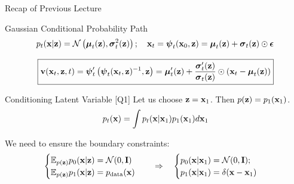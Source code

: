 \documentclass{beamer}
\begin{document}
\begin{frame}{Recap of Previous Lecture}
	\begin{block}{Gaussian Conditional Probability Path}
		\vspace{-0.5cm}
		\[
			p_t(\mathbf{x} | \mathbf{z}) = \mathcal{N}\left(\boldsymbol{\mu}_t(\mathbf{z}), \boldsymbol{\sigma}_t^2(\mathbf{z})\right); \quad \mathbf{x}_t = \boldsymbol{\psi}_t(\mathbf{x}_0, \mathbf{z}) = \boldsymbol{\mu}_t(\mathbf{z}) + \boldsymbol{\sigma}_t(\mathbf{z}) \odot \boldsymbol{\epsilon}
		\]
		\vspace{-0.5cm}
	\end{block}
	\vspace{-0.3cm}
	\[
		\boxed{\mathbf{v}(\mathbf{x}_t, \mathbf{z}, t) = \boldsymbol{\psi}_t'\left(\boldsymbol{\psi}_t(\mathbf{x}_t, \mathbf{z})^{-1}, \mathbf{z}\right) = \boldsymbol{\mu}_t'(\mathbf{z}) + \frac{\boldsymbol{\sigma}_t'(\mathbf{z})}{\boldsymbol{\sigma}_t(\mathbf{z})} \odot (\mathbf{x}_t - \boldsymbol{\mu}_t(\mathbf{z}))}
	\]
	\begin{block}{Conditioning Latent Variable [Q1]}
		Let us choose $\mathbf{z} = \mathbf{x}_1$. Then $p(\mathbf{z}) = p_1(\mathbf{x}_1)$.
		\[
			p_t(\mathbf{x}) = \int p_t(\mathbf{x} | \mathbf{x}_1) p_1(\mathbf{x}_1) d \mathbf{x}_1
		\]
		\vspace{-0.5cm}
	\end{block}
	We need to ensure the boundary constraints:
	\[
		\begin{cases}
			\mathbb{E}_{p(\mathbf{z})} p_0(\mathbf{x} | \mathbf{z}) = \mathcal{N}(0, \mathbf{I}) \\
			\mathbb{E}_{p(\mathbf{z})} p_1(\mathbf{x} | \mathbf{z}) = p_{\text{data}}(\mathbf{x})
		\end{cases}
		\quad \Rightarrow \quad 
		\begin{cases}
			p_0(\mathbf{x} | \mathbf{x}_1) = \mathcal{N}(0, \mathbf{I}); \\
			p_1(\mathbf{x} | \mathbf{x}_1) = \delta(\mathbf{x} - \mathbf{x}_1)
		\end{cases}
	\]
	\vspace{-0.3cm}
\end{frame}
\end{document}
